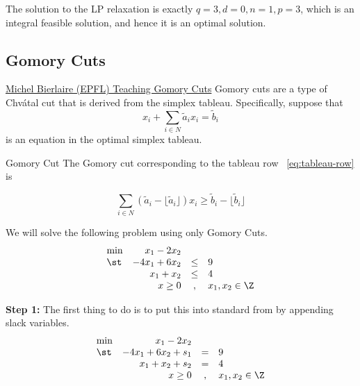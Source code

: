 \documentclass[../open-optimization/open-optimization.tex]{subfiles}
\begin{document}
\begin{example}{}{}
The solution to the LP relaxation is exactly $q = 3, d = 0, n = 1, p = 3$, which is an integral feasible solution, and hence it is an optimal solution.
\end{example}


\subsection{Gomory Cuts}
\href{https://www.youtube.com/watch?v=VdXHGNDnjjo}{Michel Bierlaire (EPFL) Teaching Gomory Cuts}
Gomory cuts are a type of Chv\'atal cut that is derived from the simplex tableau.  Specifically, suppose that 
\begin{equation}
\label{eq:tableau-row}
 x_i + \sum_{i\in N} \tilde a_i x_i = \tilde b_i
\end{equation}
is an equation in the optimal simplex tableau. 

\begin{general}{Gomory Cut}{}
The Gomory cut corresponding to the tableau row ~\eqref{eq:tableau-row} is

\begin{equation}
\label{eq:gomory-cut}
\sum_{i\in N} (\tilde a_i - \lfloor \tilde a_i \rfloor) x_i \geq \tilde b_i - \lfloor \tilde b_i\rfloor
\end{equation}


\end{general}


We will solve the following problem using only Gomory Cuts.
\begin{equation*}
\begin{array}{lrcl}
\min & x_1 - 2x_2\\
\st & -4x_1 + 6x_2  & \leq & 9\\
& x_1 + x_2   & \leq & 4\\
& x \geq 0 & , & x_1,x_2 \in \Z
\end{array}
\end{equation*}

\textbf{Step 1:} The first thing to do is to put this into standard from by appending slack variables.
\begin{equation}
\label{eq:gomory-standard-form}
\begin{array}{lrcl}
\min & x_1 - 2x_2\\
\st & -4x_1 + 6x_2 + s_1 & = & 9\\
& x_1 + x_2 + s_2  & = & 4\\
& x \geq 0 & , & x_1,x_2 \in \Z
\end{array}
\end{equation}
\end{document}
